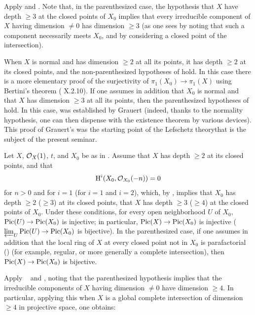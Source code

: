 Apply  and . Note that, in the parenthesized case, the hypothesis that $X$ have depth $\geq 3$ at the closed points of $X_0$ implies that every irreducible component of $X$ having dimension $\neq 0$ has dimension $\geq 3$ (as one sees by noting that such a component necessarily meets $X_0$, and by considering a closed point of the intersection).

\begin{remarquestar}
When $X$ is normal and has dimension $\geq 2$ at all its points, it has depth $\geq 2$ at its closed points, and the non-parenthesized hypotheses of  hold. In this case there is a more elementary proof of the surjectivity of $\pi_1(X_0)\to \pi_1(X)$ using Bertini's theorem (\cf {} X.2.10). If one assumes in addition that $X_0$ is normal and that $X$ has dimension $\geq 3$ at all its points, then the parenthesized hypotheses of  hold. In this case,  was established by Grauert (indeed, thanks to the normality hypothesis, one can then dispense with the existence theorem  by various devices)\pageoriginale. This proof of Grauert's was the starting point of the \og Lefschetz theory\fg that is the subject of the present seminar.
\end{remarquestar}

\begin{corollaire} \label{XII.3.6} Let $X$, $\mathcal O_X(1)$, $t$, and $X_0$ be as in . Assume that $X$ has depth $\geq 2$ at its closed points, and that
\[
\mathrm H^i(X_0, \mathcal O_{X_0}(-n))=0
\]
for $n>0$ and for $i=1$ (\resp for $i=1$ and $i=2$), which, by , implies that $X_0$ has depth $\geq 2$ (\resp $\geq 3$) at its closed points, \ie that $X$ has depth $\geq 3$ (\resp $\geq 4$) at the closed points of $X_0$. Under these conditions, for every open neighborhood $U$ of $X_0$, $\operatorname{Pic}(U)\to\operatorname{Pic}(X_0)$ is injective; in particular, $\operatorname{Pic}(X)\to\operatorname{Pic}(X_0)$ is injective (\resp $\varprojlim_U \operatorname{Pic}(U)\to\operatorname{Pic}(X_0)$ is bijective). In the parenthesized case, if one assumes in addition that the local ring of $X$ at every closed point not in $X_0$ is parafactorial () (for example, regular, or more generally a complete intersection), then $\operatorname{Pic}(X)\to\operatorname{Pic}(X_0)$ is bijective.
\end{corollaire}
Apply ~ and , noting that the parenthesized hypothesis implies that the irreducible components of $X$ having dimension $\neq 0$ have dimension $\geq 4$. In particular, applying this when $X$ is a global complete intersection of dimension $\geq 4$ in projective space, one obtains:

